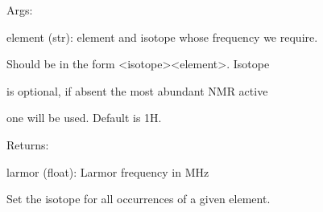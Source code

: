 \documentclass[letterpaper,10pt,english]{sphinxmanual}
\begin{document}
\begin{fulllineitems}
\begin{fulllineitems}
\begin{DUlineblock}{0em}
\item[] Args:
\item[]
\begin{DUlineblock}{\DUlineblockindent}
\item[] element (str): element and isotope whose frequency we require.
\item[]
\begin{DUlineblock}{\DUlineblockindent}
\item[] Should be in the form \textless{}isotope\textgreater{}\textless{}element\textgreater{}. Isotope
\item[] is optional, if absent the most abundant NMR active
\item[] one will be used. Default is 1H.
\end{DUlineblock}
\end{DUlineblock}
\end{DUlineblock}

\begin{DUlineblock}{0em}
\item[] Returns:
\item[]
\begin{DUlineblock}{\DUlineblockindent}
\item[] larmor (float): Larmor frequency in MHz
\end{DUlineblock}
\end{DUlineblock}

\end{fulllineitems}


\begin{fulllineitems}
\label{doctree/soprano.calculate.nmr.nmr:soprano.calculate.nmr.nmr.NMRCalculator.set_element_isotope}
Set the isotope for all occurrences of a given element.


\end{fulllineitems}
\end{fulllineitems}
\end{document}
